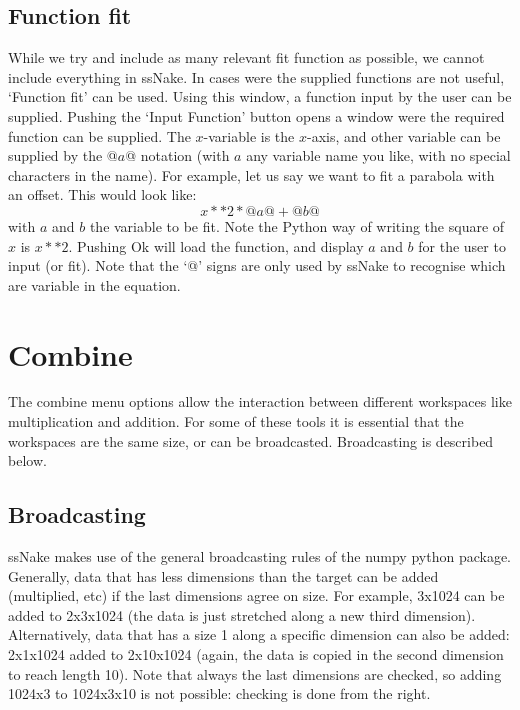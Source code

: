 \documentclass[11pt,a4paper]{article}
\begin{document}
\subsection{Function fit}
While we try and include as  many relevant fit function as possible, we cannot include everything in
ssNake. In cases were the supplied functions are not useful, `Function fit' can be used. Using this
window, a function input by the user can be supplied. Pushing the `Input Function' button opens a
window were the required function can be supplied. The $x$-variable is the $x$-axis, and other
variable can be supplied by the @$a$@ notation (with $a$ any variable name you like, with no special
characters in the name). For example, let us say we want to fit a parabola with an offset. This would look like:
\begin{equation}
  x ** 2 * @a@ + @b@
\end{equation}
with $a$ and $b$ the variable to be fit. Note the Python way of writing the square of $x$ is $x **
2$. Pushing Ok will load the function, and display $a$ and $b$ for the user to input (or fit). Note
that the `@' signs are only used by ssNake to recognise which are variable in the equation.


\section{Combine}
The combine menu options allow the interaction between different workspaces like multiplication and addition. For some of these tools it is essential that the workspaces
are the same size, or can be broadcasted. Broadcasting is described below.

\subsection{Broadcasting}
ssNake makes use of the general broadcasting rules of the numpy python package. Generally, data that has less dimensions than the target can be added (multiplied, etc)
if the last dimensions agree on size. For example, 3x1024 can be added to 2x3x1024 (the data is just stretched along a new third dimension). Alternatively, data that has a size 1
along a specific dimension can also be added: 2x1x1024 added to 2x10x1024 (again, the data is copied in the second dimension to reach length 10).
Note that always the last dimensions are checked, so adding 1024x3 to 1024x3x10 is not possible: checking is done from the right.
\end{document}
